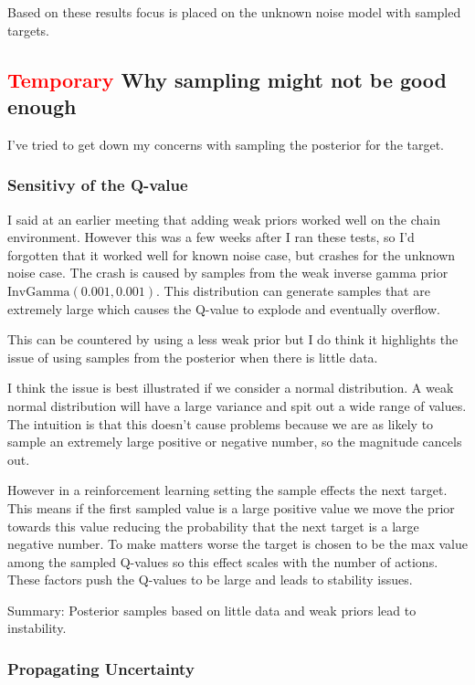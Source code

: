 Based on these results focus is placed on the unknown noise model with sampled targets.





\subsection{\textcolor{red}{Temporary} Why sampling might not be good enough}

I've tried to get down my concerns with sampling the posterior for the target.
 
\subsubsection{Sensitivy of the Q-value}

I said at an earlier meeting that adding weak priors worked well on the chain environment. However this was a few weeks after I ran these tests, so I'd forgotten that it worked well for known noise case, but crashes for the unknown noise case. The crash is caused by samples from the weak inverse gamma prior $\text{InvGamma}(0.001, 0.001)$. This distribution can generate samples that are extremely large which causes the Q-value to explode and eventually overflow.

This can be countered by using a less weak prior but I do think it highlights the issue of using samples from the posterior when there is little data.

I think the issue is best illustrated if we consider a normal distribution. A weak normal distribution will have a large variance and spit out a wide range of values. The intuition is that this doesn't cause problems because we are as likely to sample an extremely large positive or negative number, so the magnitude cancels out.

However in a reinforcement learning setting the sample effects the next target. This means if the first sampled value is a large positive value we move the prior towards this value reducing the probability that the next target is a large negative number. To make matters worse the target is chosen to be the max value among the sampled Q-values so this effect scales with the number of actions. These factors push the Q-values to be large and leads to stability issues.

Summary: Posterior samples based on little data and weak priors lead to instability.

\subsubsection{Propagating Uncertainty}

